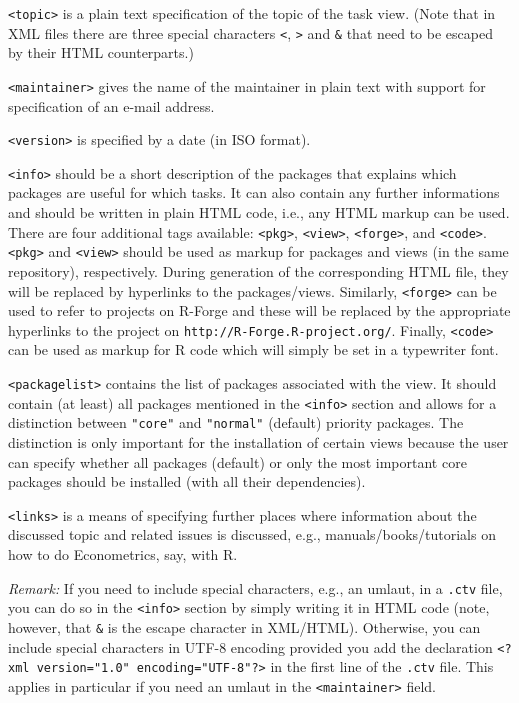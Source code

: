 \documentclass[a4paper]{article}
\begin{document}
\verb/<topic>/ is a plain text specification of the topic of the task view.
(Note that in XML files there are three special characters \verb/</, \verb/>/
and \verb/&/ that need to be escaped by their HTML counterparts.)

\verb/<maintainer>/ gives the name of the maintainer in plain text
with support for specification of an e-mail address.

\verb/<version>/ is specified by a date (in ISO format).

\verb/<info>/ should be a short description of the packages that explains
which packages are useful for which tasks. It can also contain any further
informations and should be written in plain HTML code, i.e., any HTML markup
can be used. There are four additional tags available: \verb/<pkg>/, \verb/<view>/,
\verb/<forge>/, and \verb/<code>/. \verb/<pkg>/ and
\verb/<view>/ should be used as markup for packages and views (in the same repository), respectively.
During generation of the corresponding HTML file, they will be replaced by
hyperlinks to the packages/views. Similarly, \verb/<forge>/ can be used to
refer to projects on \textsf{R}-Forge and these will be replaced by the appropriate
hyperlinks to the project on \texttt{http://R-Forge.R-project.org/}.
Finally, \verb/<code>/ can be used as markup for \textsf{R} code which will 
simply be set in a typewriter font.

\verb/<packagelist>/ contains the list of packages associated with the view.
It should contain (at least) all packages mentioned in the \verb/<info>/ section
and allows for a distinction between \verb/"core"/ and \verb/"normal"/ (default)
priority packages. The distinction is only important for the installation of
certain views because the user can specify whether all packages (default) or only
the most important core packages should be installed (with all their dependencies).

\verb/<links>/ is a means of specifying further places where information about
the discussed topic and related issues is discussed, e.g., manuals/books/tutorials
on how to do Econometrics, say, with \textsf{R}.

\textit{Remark:} If you need to include special characters, e.g., an umlaut, in
a \verb/.ctv/ file, you can do so in the \verb/<info>/ section by simply writing
it in HTML code (note, however, that \verb/&/ is the escape character in XML/HTML).
Otherwise, you can include special characters
in UTF-8 encoding provided you add the declaration
\verb/<?xml version="1.0" encoding="UTF-8"?>/ in the first line of the \verb/.ctv/ file.
This applies in particular if you need an umlaut in the \verb/<maintainer>/ field.
\end{document}
